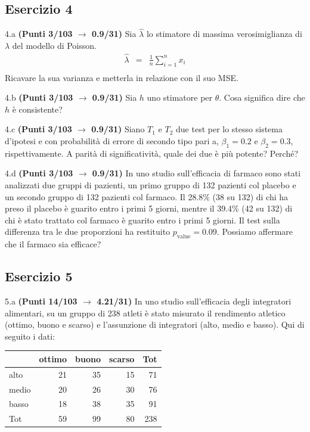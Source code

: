 \documentclass[
  11pt,
]{book}
\theoremstyle{mytheoremstyle}
\theoremstyle{mydefstyle}
\begin{document}
\subsection{Esercizio 4}\label{esercizio-4-21}

4.a \textbf{(Punti 3/103 \(\rightarrow\) 0.9/31)} Sia \(\hat \lambda\) lo stimatore di massima verosimiglianza di \(\lambda\) del modello di Poisson.
\begin{eqnarray*}
  \hat\lambda &=&  \frac 1n\sum_{i=1}^nx_i\\
\end{eqnarray*}
Ricavare la sua varianza e metterla in relazione con il suo MSE.

4.b \textbf{(Punti 3/103 \(\rightarrow\) 0.9/31)} Sia \(h\) uno stimatore per \(\theta\). Cosa significa dire che \(h\) è consistente?

4.c \textbf{(Punti 3/103 \(\rightarrow\) 0.9/31)} Siano \(T_1\) e \(T_2\) due test per lo stesso sistema d'ipotesi e con probabilità di errore di secondo tipo pari a, \(\beta_1=0.2\) e \(\beta_2=0.3\), rispettivamente. A parità di significatività, quale dei due è più potente? Perché?

4.d \textbf{(Punti 3/103 \(\rightarrow\) 0.9/31)} In uno studio sull'efficacia di farmaco sono stati analizzati due gruppi di pazienti, un primo gruppo di 132 pazienti col placebo e un secondo gruppo di 132 pazienti col farmaco. Il 28.8\% (38 su 132) di chi ha preso il placebo è guarito entro i primi 5 giorni, mentre il 39.4\% (42 su 132) di chi è stato trattato col farmaco è guarito entro i primi 5 giorni. Il test sulla differenza tra le due proporzioni ha restituito \(p_\text{value}=0.09\). Possiamo affermare che il farmaco sia efficace?

\subsection{Esercizio 5}\label{esercizio-5-20}

5.a \textbf{(Punti 14/103 \(\rightarrow\) 4.21/31)} In uno studio sull'efficacia degli integratori alimentari, su un gruppo di 238 atleti è stato misurato il rendimento atletico (ottimo, buono e scarso) e l'assunzione di integratori (alto, medio e basso). Qui di seguito i dati:

\begin{table}[H]
\centering
\begin{tabular}{lrrrr}
\toprule
  & ottimo & buono & scarso & Tot\\
\midrule
alto & 21 & 35 & 15 & 71\\
medio & 20 & 26 & 30 & 76\\
basso & 18 & 38 & 35 & 91\\
Tot & 59 & 99 & 80 & 238\\
\bottomrule
\end{tabular}
\end{table}
\end{document}
